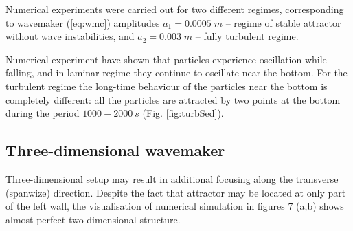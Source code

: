 \documentclass[a4wide,fontsize=12pt]{article}
\begin{document}
Numerical experiments were carried out for two different regimes, corresponding to wavemaker (\ref{eq:wmc})  amplitudes $a_1=0.0005\;m$ -- regime of stable attractor without wave instabilities, and $a_2=0.003\;m$ -- fully turbulent regime. 

Numerical experiment have shown that particles experience oscillation while falling, and in laminar regime they continue to oscillate near the bottom. For the turbulent regime the long-time behaviour of the particles near the bottom is completely different: all the particles are attracted by two points at the bottom during the period $1000-2000\ s$ (Fig. \ref{fig:turbSed}).




\subsection{Three-dimensional wavemaker}

Three-dimensional setup may result in additional focusing along the transverse (spanwize) direction\cite{2018PilletErmanyukMaasSibgatDauxois}.
Despite the fact that attractor may be located at only part of the left wall, the visualisation of numerical simulation in figures 7 (a,b) shows almost perfect two-dimensional structure. 


\end{document}
